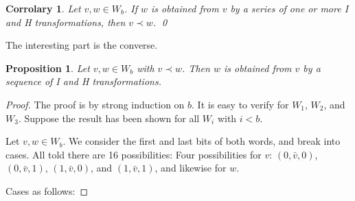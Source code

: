 \documentclass[12pt]{article}
\DeclareMathOperator{\val}{val}
\newtheorem{prop}[conj]{Proposition}
\newtheorem{corr}[conj]{Corrolary}
\newcommand{\barv}{\bar{v}}
\newcommand{\barw}{\bar{w}}
\newcommand{\newthought}{%
  \smallskip\centerline{\rule{2in}{0.5pt}}\smallskip}
\begin{document}
\begin{corr}
  Let $v,w \in W_b$. If $w$ is obtained from $v$ by a series of one or
  more I and H transformations, then $v\prec w$. \qed
\end{corr}

The interesting part is the converse.


\begin{prop}\label{prop:HI}
  Let $v,w \in W_b$ with $v \prec w$. Then $w$ is obtained from $v$
  by a sequence of I and H transformations. 
\end{prop}

\begin{proof}
  The proof is by strong induction on $b$. It is easy to verify for
  $W_1$, $W_2$, and $W_3$. Suppose the result has been shown for all
  $W_i$ with $i<b$. 

  Let $v,w \in W_b$. We consider the first and last bits of both
  words, and break into cases. All told there are 16 possibilities:
  Four possibilities for $v$: $(0,\barv,0)$, $(0,\barv,1)$,
  $(1,\barv,0)$, and $(1,\barv,1)$, and likewise for $w$.


  Cases as follows:

\end{proof}
\end{document}
